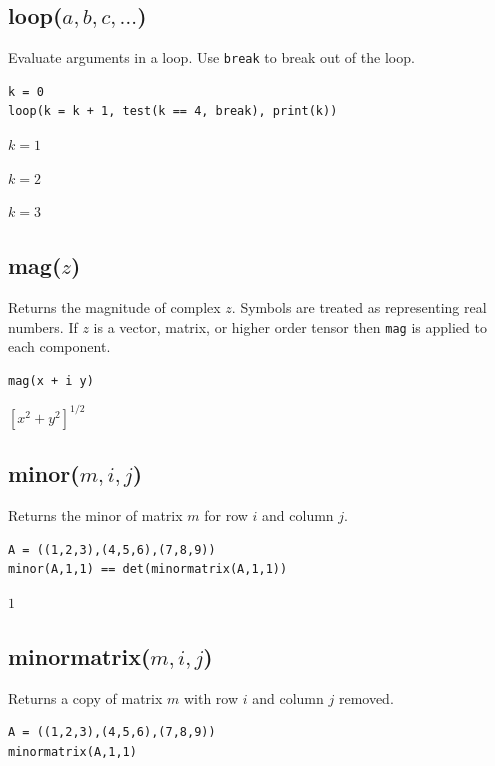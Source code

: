 \subsection*{loop($a,b,c,\ldots$)}

Evaluate arguments in a loop. Use \verb$break$ to break out of the loop.

{\color{blue}
\begin{verbatim}
k = 0
loop(k = k + 1, test(k == 4, break), print(k))
\end{verbatim}
}

$k=1$

$k=2$

$k=3$

\subsection*{mag($z$)}

Returns the magnitude of complex $z$.
Symbols are treated as representing real numbers.
If $z$ is a vector, matrix, or higher order tensor then
\verb$mag$ is applied to each component.

{\color{blue}
\begin{verbatim}
mag(x + i y)
\end{verbatim}
}

$\displaystyle
\left[x^2+y^2\right]^{1/2}
$

\subsection*{minor($m,i,j$)}

Returns the minor of matrix $m$ for row $i$ and column $j$.

{\color{blue}
\begin{verbatim}
A = ((1,2,3),(4,5,6),(7,8,9))
minor(A,1,1) == det(minormatrix(A,1,1))
\end{verbatim}
}

$1$

\subsection*{minormatrix($m,i,j$)}

Returns a copy of matrix $m$ with row $i$ and column $j$ removed.

{\color{blue}
\begin{verbatim}
A = ((1,2,3),(4,5,6),(7,8,9))
minormatrix(A,1,1)
\end{verbatim}
}

